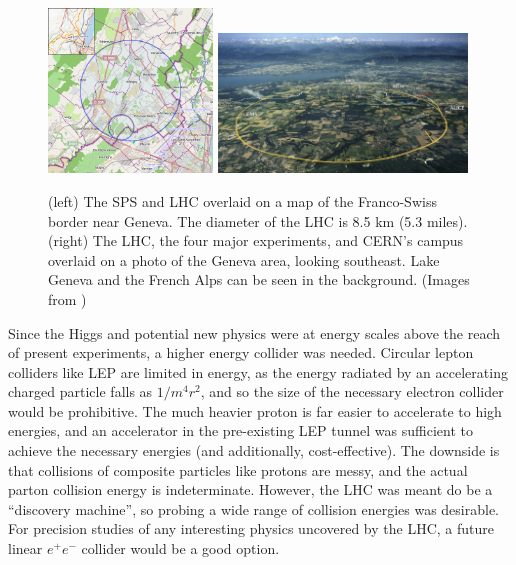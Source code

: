\begin{figure}[t]
  \begin{center}
    \includegraphics[width=0.39\textwidth]{figs/cms/lhc_osm.png}
    \includegraphics[width=0.59\textwidth]{figs/cms/lhc_photo.jpg} 
    \caption{(left) The SPS and LHC overlaid on a map of the Franco-Swiss border near Geneva. The diameter of
      the LHC is 8.5 km (5.3 miles). (right) The LHC, the four major experiments, and CERN's campus 
      overlaid on a photo of the Geneva area, looking southeast. Lake Geneva and the French Alps can
      be seen in the background. (Images from \cite{lhc_map,lhc_photo})
            }
    \label{fig:lhc}
  \end{center}
\end{figure}

Since the Higgs and potential new physics were at energy scales above the reach of
present experiments, a higher energy collider was needed. 
Circular lepton colliders like LEP
are limited in energy, as the energy radiated by an accelerating charged particle falls as 
$1/m^4r^2$, and so the size of the necessary electron collider would be prohibitive.
The much heavier proton is far easier to accelerate to high energies, and an accelerator
in the pre-existing LEP tunnel was sufficient to achieve the necessary energies
(and additionally, cost-effective).
The downside is that collisions of composite particles like protons are messy, and
the actual parton collision energy is indeterminate. However, the LHC was meant do be a 
``discovery machine'', so probing a wide range of collision energies was desirable.
For precision studies of any interesting physics uncovered by the LHC, a future
linear $e^+e^-$ collider would be a good option.


